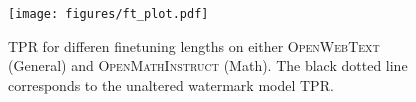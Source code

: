 \begin{figure}[t]
    \centering
    \texttt{[image: figures/ft\_plot.pdf]}
    \caption{TPR for differen finetuning lengths on either \textsc{OpenWebText} (General) and \textsc{OpenMathInstruct} (Math). The black dotted line corresponds to the unaltered watermark model TPR.}
    \label{fig:ft_tpr}
    \vspace{-0.2em}
\end{figure}
